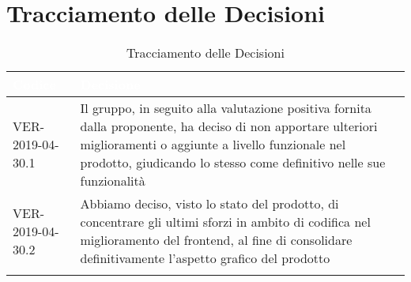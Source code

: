 
\section{Tracciamento delle Decisioni}

\begin{longtable}{|C{.33\textwidth}|C{.61\textwidth}|}
\hline
{}\textbf{\textcolor{white}{Codice}} & \textbf{\textcolor{white}{Decisione}}\\
\hline \hline
VER-2019-04-30.1 & Il gruppo, in seguito alla valutazione positiva fornita dalla proponente, ha deciso di non apportare ulteriori miglioramenti o aggiunte a livello funzionale nel prodotto, giudicando lo stesso come definitivo nelle sue funzionalità\\
\hline
{}VER-2019-04-30.2 & Abbiamo deciso, visto lo stato del prodotto, di concentrare gli ultimi sforzi in ambito di codifica nel miglioramento del frontend, al fine di consolidare definitivamente l'aspetto grafico del prodotto\\
\hline
\caption{Tracciamento delle Decisioni}
\end{longtable}

